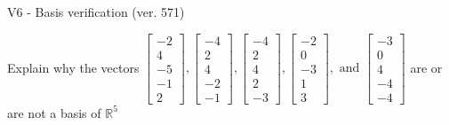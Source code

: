 \begin{exercise}
  \begin{exerciseTitle}V6 - Basis verification (ver. 571)\end{exerciseTitle}
  \begin{exerciseStatement}
    Explain why the vectors \(\left[\begin{array}{r}
-2 \\
4 \\
-5 \\
-1 \\
2
\end{array}\right] , \left[\begin{array}{r}
-4 \\
2 \\
4 \\
-2 \\
-1
\end{array}\right] , \left[\begin{array}{r}
-4 \\
2 \\
4 \\
2 \\
-3
\end{array}\right] , \left[\begin{array}{r}
-2 \\
0 \\
-3 \\
1 \\
3
\end{array}\right] , \text{ and } \left[\begin{array}{r}
-3 \\
0 \\
4 \\
-4 \\
-4
\end{array}\right]\) are or are not a basis of \(\mathbb{R}^5\)	



\end{exerciseStatement}
\end{exercise}
